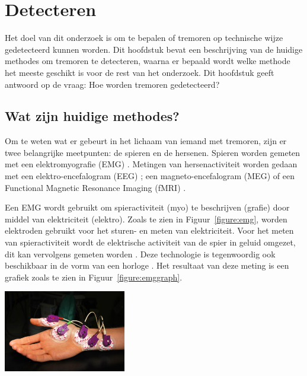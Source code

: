 \section{Detecteren}
\label{section:detection}

Het doel van dit onderzoek is om te bepalen of tremoren op technische wijze gedetecteerd kunnen worden.
Dit hoofdstuk bevat een beschrijving van de huidige methodes om tremoren te detecteren,
waarna er bepaald wordt welke methode het meeste geschikt is voor de rest van het onderzoek.
Dit hoofdstuk geeft antwoord op de vraag: Hoe worden tremoren gedetecteerd?

\subsection{Wat zijn huidige methodes?}

Om te weten wat er gebeurt in het lichaam van iemand met tremoren, zijn er twee belangrijke meetpunten:
de spieren en de hersenen. Spieren worden gemeten met een elektromyografie (EMG) \cite{knf2022,elsevier2022,sips2024}.
Metingen van hersenactiviteit worden gedaan met een elektro-encefalogram (EEG) \cite{knf2022,elsevier2022};
een magneto-encefalogram (MEG) of een Functional Magnetic Resonance Imaging (fMRI) \cite{elsevier2022}.

Een EMG wordt gebruikt om spieractiviteit (myo) te beschrijven (grafie) door middel van elektriciteit (elektro).
Zoals te zien in Figuur~\ref{figure:emg}, worden elektroden gebruikt voor het sturen- en meten van elektriciteit.
Voor het meten van spieractiviteit wordt de elektrische activiteit van de spier in geluid omgezet,
dit kan vervolgens gemeten worden \cite{knf2022,neuro2009}.
Deze technologie is tegenwoordig ook beschikbaar in de vorm van een horloge \cite{frontiers2022,sips2024}.
Het resultaat van deze meting is een grafiek zoals te zien in Figuur~\ref{figure:emggraph}.

\begin{center}
    \includegraphics[width=0.4\textwidth]{./graphics/img-emg.jpg}
    \label{figure:emg}
\end{center}

